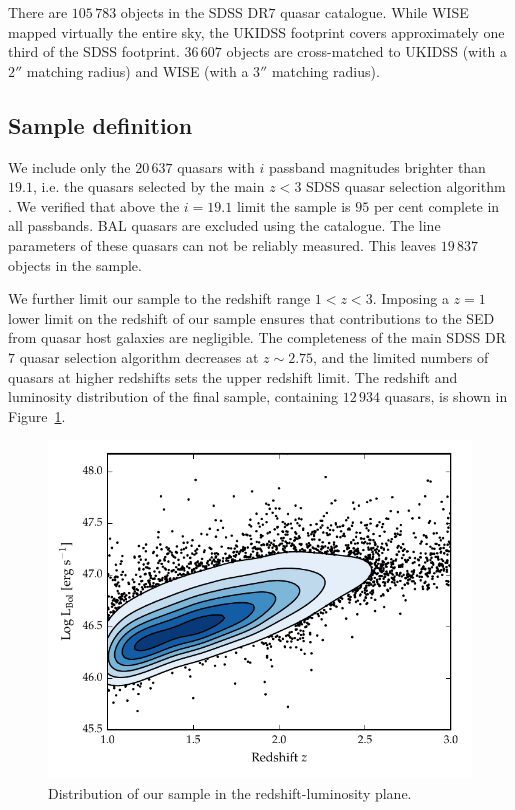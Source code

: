 There are $105\,783$ objects in the SDSS DR$7$ quasar catalogue. 
While WISE mapped virtually the entire sky, the UKIDSS footprint covers approximately one third of the SDSS footprint. 
$36\,607$ objects are cross-matched to UKIDSS (with a $2''$ matching radius) and WISE (with a $3$$''$ matching radius).

\subsection{Sample definition}

We include only the $20\,637$ quasars with $i$ passband magnitudes brighter than $19.1$, i.e. the quasars selected by the main $z<3$ SDSS quasar selection algorithm \citep{richards02}. 
We verified that above the $i=19.1$ limit the sample is $95$ per cent complete in all passbands.
BAL quasars are excluded using the \citet{allen11} catalogue.
The  line parameters of these quasars can not be reliably measured.
This leaves $19\,837$  objects in the sample. 

We further limit our sample to the redshift range $1 < z < 3$. 
Imposing a $z=1$ lower limit on the redshift of our sample ensures that contributions to the SED from quasar host galaxies are negligible.
The completeness of the main SDSS DR$7$ quasar selection algorithm decreases at $z\sim2.75$, and the limited numbers of quasars at higher redshifts sets the upper redshift limit. 
The redshift and luminosity distribution of the final sample, containing $12\,934$ quasars, is shown in Figure~\ref{fig:lum_z}. 

\begin{figure}
  \centering
  \includegraphics[width=\textwidth]{figures/chapter05/lum_z.pdf}
  \caption[{Distribution of our sample in the redshift-luminosity plane.}]{Distribution of our sample in the redshift-luminosity plane.}
  \label{fig:lum_z}
\end{figure}

